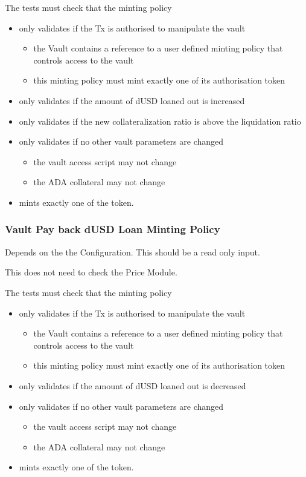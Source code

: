 \documentclass{article} %
\begin{document}
The tests must check that the minting policy
\begin{itemize}
  \item only validates if the Tx is authorised to manipulate the vault
  \begin{itemize}
    \item the Vault contains a reference to a user defined minting policy that controls access to the vault
    \item this minting policy must mint exactly one of its authorisation token
  \end{itemize}
  \item only validates if the amount of dUSD loaned out is increased
  \item only validates if the new collateralization ratio is above the liquidation ratio
  \item only validates if no other vault parameters are changed
  \begin{itemize}
    \item the vault access script may not change
    \item the ADA collateral may not change
  \end{itemize}
  \item mints exactly one of the token.
\end{itemize}

\subsubsection{Vault Pay back dUSD Loan Minting Policy}
Depends on the the Configuration.
This should be a read only input.

This does not need to check the Price Module.

The tests must check that the minting policy
\begin{itemize}
  \item only validates if the Tx is authorised to manipulate the vault
  \begin{itemize}
    \item the Vault contains a reference to a user defined minting policy that controls access to the vault
    \item this minting policy must mint exactly one of its authorisation token
  \end{itemize}
  \item only validates if the amount of dUSD loaned out is decreased
  \item only validates if no other vault parameters are changed
  \begin{itemize}
    \item the vault access script may not change
    \item the ADA collateral may not change
  \end{itemize}
  \item mints exactly one of the token.
\end{itemize}
\end{document}
